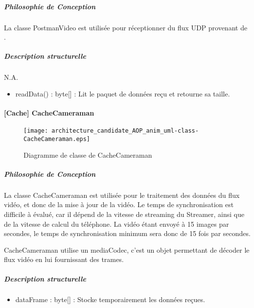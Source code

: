         \subparagraph{Philosophie de Conception}%
        La classe PostmanVideo est utilisée pour réceptionner du flux UDP provenant de \appliLin.

        \subparagraph{Description structurelle}%
        
            N.A.
            \begin{itemize}
                \item {readData() : byte[] : Lit le paquet de  données reçu et retourne sa taille.}
            \end{itemize} 

\newpage 

    \paragraph{[Cache] CacheCameraman}%

    \begin{figure} [H]
        \centering
        \texttt{[image: architecture\_candidate\_AOP\_anim\_uml-class-CacheCameraman.eps]}
        \caption{Diagramme de classe de CacheCameraman}
        \label{Classe-CacheCameraman}
    \end{figure}

        \subparagraph{Philosophie de Conception}%
        La classe CacheCameraman est utilisée pour le traitement des données du flux vidéo, et donc de la mise à jour de la vidéo.
        Le temps de synchronisation est difficile à évalué, car il dépend de la vitesse de streaming du Streamer, ainsi que de la vitesse de calcul du téléphone.
        La vidéo étant envoyé à 15 images par secondes, le temps de synchronisation minimum sera donc de 15 fois par secondes.

        CacheCameraman utilise un mediaCodec, c'est un objet permettant de décoder le flux vidéo en lui fournissant des trames.

        \subparagraph{Description structurelle}%
        
            \begin{itemize}
            \item {dataFrame : byte[] : Stocke temporairement les données reçues.}
            \end{itemize}

